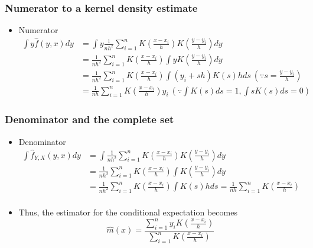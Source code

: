 \documentclass[aspectratio=169]{beamer}
\begin{document}
\begin{frame}
\frametitle{Numerator to a kernel density estimate}
\begin{itemize}
\item Numerator
\begin{align*}
 \int y \hat{f}(y,x)dy&=\int y \frac{1}{nh^2}\sum_{i=1}^n K\left(\frac{x-x_i}{h}\right)K\left(\frac{y-y_i}{h}\right)dy\\
 &= \frac{1}{nh^2}\sum_{i=1}^n K\left(\frac{x-x_i}{h}\right)\int yK\left(\frac{y-y_i}{h}\right)dy\\
 &=\frac{1}{nh^2}\sum_{i=1}^n K\left(\frac{x-x_i}{h}\right)\int (y_i+sh)K\left(s\right)hds \ \left(\because s=\frac{y-y_i}{h}\right)\\
 &= \frac{1}{nh}\sum_{i=1}^n K\left(\frac{x-x_i}{h}\right)y_i\ (\because \int K(s)ds=1, \int sK(s)ds=0)
 \end{align*}
\end{itemize}
\end{frame}

\begin{frame}
\frametitle{Denominator and the complete set}
\begin{itemize}
\item Denominator
\[
 \begin{aligned}
 \int \hat{f}_{Y,X}(y,x)dy&=\int \frac{1}{nh^2}\sum_{i=1}^nK\left(\frac{x-x_i}{h}\right)K\left(\frac{y-y_i}{h}\right)dy\\
 &=\frac{1}{nh^2}\sum_{i=1}^nK\left(\frac{x-x_i}{h}\right)\int K\left(\frac{y-y_i}{h}\right)dy\\
  &=\frac{1}{nh^2}\sum_{i=1}^nK\left(\frac{x-x_i}{h}\right)\int K\left(s\right)hds=\frac{1}{nh}\sum_{i=1}^nK\left(\frac{x-x_i}{h}\right) \\
\end{aligned}
\]
\item  Thus, the estimator for the conditional expectation becomes
 \[
\hat{m}(x)= \frac{\sum_{i=1}^n y_iK\left(\frac{x-x_i}{h}\right)}{\sum_{i=1}^n K\left(\frac{x-x_i}{h}\right)}
 \]
\end{itemize}
\end{frame}
\end{document}
